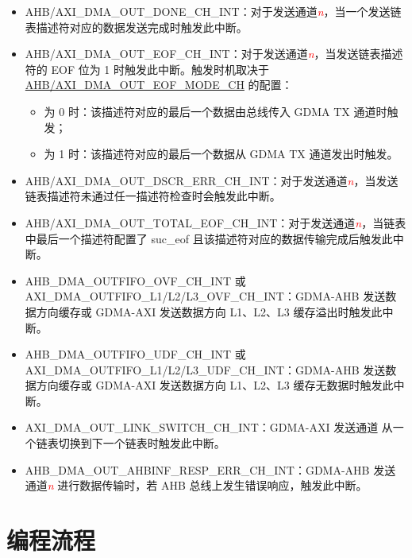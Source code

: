 \documentclass[main\_\_CN.tex]{subfiles}
\begin{document}
\begin{itemize}
    \item \label{int:GDMAOUTDONEINT}AHB/AXI\_DMA\_OUT\_DONE\_CH\_INT：对于发送通道\textcolor{red}{\it{n}}，当一个发送链表描述符对应的数据发送完成时触发此中断。
    \item \label{int:GDMAOUTEOFINT}AHB/AXI\_DMA\_OUT\_EOF\_CH\_INT：对于发送通道\textcolor{red}{\it{n}}，当发送链表描述符的 EOF 位为 1 时触发此中断。触发时机取决于 \hyperref[fielddesc:AHBDMAOUTEOFMODECHN]{AHB/AXI\_DMA\_OUT\_EOF\_MODE\_CH} 的配置：
        \begin{itemize}
            \item 为 0 时：该描述符对应的最后一个数据由总线传入 GDMA TX 通道时触发；
            \item 为 1 时：该描述符对应的最后一个数据从 GDMA TX 通道发出时触发。
        \end{itemize}
    \item \label{int:GDMAOUTDSCRERRINT}AHB/AXI\_DMA\_OUT\_DSCR\_ERR\_CH\_INT：对于发送通道\textcolor{red}{\it{n}}，当发送链表描述符未通过任一描述符检查时会触发此中断。
    \item \label{int:GDMAOUTTOTALEOFINT}AHB/AXI\_DMA\_OUT\_TOTAL\_EOF\_CH\_INT：对于发送通道\textcolor{red}{\it{n}}，当链表中最后一个描述符配置了 suc\_eof 且该描述符对应的数据传输完成后触发此中断。
    \item \label{int:GDMAOUTFIFOOVFINT} AHB\_DMA\_OUTFIFO\_OVF\_CH\_INT 或 AXI\_DMA\_OUTFIFO\_L1/L2/L3\_OVF\_CH\_INT：GDMA-AHB 发送数据方向缓存或 GDMA-AXI 发送数据方向 L1、L2、L3 缓存溢出时触发此中断。
    \item \label{int:GDMAOUTFIFOUDFINT}AHB\_DMA\_OUTFIFO\_UDF\_CH\_INT 或 AXI\_DMA\_OUTFIFO\_L1/L2/L3\_UDF\_CH\_INT：GDMA-AHB 发送数据方向缓存或 GDMA-AXI 发送数据方向 L1、L2、L3 缓存无数据时触发此中断。
    \item \label{int:AXIDMAOUTLINKSWITCHINT}AXI\_DMA\_OUT\_LINK\_SWITCH\_CH\_INT：GDMA-AXI 发送通道  从一个链表切换到下一个链表时触发此中断。
    \item  \label{int:GDMAOUTAHBINFRESPERRINT}AHB\_DMA\_OUT\_AHBINF\_RESP\_ERR\_CH\_INT：GDMA-AHB 发送通道\textcolor{red}{\it{n}} 进行数据传输时，若 AHB 总线上发生错误响应，触发此中断。
\end{itemize}


\section{编程流程}
\end{document}
